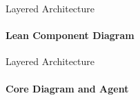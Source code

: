 
\begin{frame}{Layered Architecture}
    \framesubtitle{Lean Component Diagram}

        \centering
        
        \label{fig:component-diagram-lean}
\end{frame}
\begin{frame}{Layered Architecture}
    \framesubtitle{Core Diagram and Agent}

        \centering
        
        \label{fig:core-diagram}
\end{frame}

%
%
%
%

